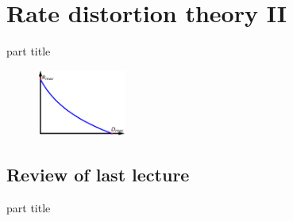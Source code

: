 
\DeclareMathOperator{\cwd}{codeword}
\newtheorem{proposition}{Proposition}
\usepackage{forest}
\usepackage{lipsum}
\usepackage{subcaption}


\section{Rate distortion theory II}

\begin{frame}
 \vspace{8.0ex}
\begin{center}
\begin{beamercolorbox}[sep=16pt,center]{part title}
\insertsection\par
\end{beamercolorbox}
\end{center}
\begin{figure}
\includegraphics[width=0.26\textwidth]{RD_II/RD_Plot_Final.png}
\captionsetup{labelformat=empty}
\end{figure}
\end{frame}




\subsection{Review of last lecture}

\begin{frame}
 \vspace{12.0ex}
\begin{center}
\begin{beamercolorbox}[sep=12pt,center]{part title}
\insertsubsection\par
\end{beamercolorbox}
\end{center}
\end{frame}


